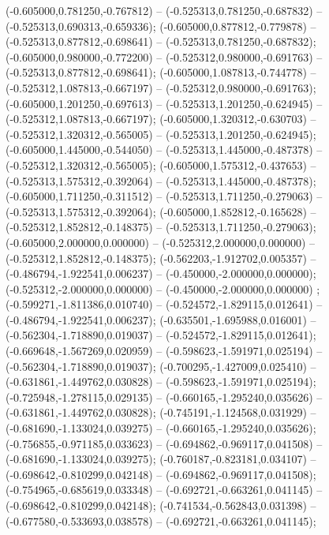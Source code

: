  (-0.605000,0.781250,-0.767812) -- (-0.525313,0.781250,-0.687832) -- (-0.525313,0.690313,-0.659336);
 (-0.605000,0.877812,-0.779878) -- (-0.525313,0.877812,-0.698641) -- (-0.525313,0.781250,-0.687832);
 (-0.605000,0.980000,-0.772200) -- (-0.525312,0.980000,-0.691763) -- (-0.525313,0.877812,-0.698641);
 (-0.605000,1.087813,-0.744778) -- (-0.525312,1.087813,-0.667197) -- (-0.525312,0.980000,-0.691763);
 (-0.605000,1.201250,-0.697613) -- (-0.525313,1.201250,-0.624945) -- (-0.525312,1.087813,-0.667197);
 (-0.605000,1.320312,-0.630703) -- (-0.525312,1.320312,-0.565005) -- (-0.525313,1.201250,-0.624945);
 (-0.605000,1.445000,-0.544050) -- (-0.525313,1.445000,-0.487378) -- (-0.525312,1.320312,-0.565005);
 (-0.605000,1.575312,-0.437653) -- (-0.525313,1.575312,-0.392064) -- (-0.525313,1.445000,-0.487378);
 (-0.605000,1.711250,-0.311512) -- (-0.525313,1.711250,-0.279063) -- (-0.525313,1.575312,-0.392064);
 (-0.605000,1.852812,-0.165628) -- (-0.525312,1.852812,-0.148375) -- (-0.525313,1.711250,-0.279063);
 (-0.605000,2.000000,0.000000) -- (-0.525312,2.000000,0.000000) -- (-0.525312,1.852812,-0.148375);
 (-0.562203,-1.912702,0.005357) -- (-0.486794,-1.922541,0.006237) -- (-0.450000,-2.000000,0.000000);
 (-0.525312,-2.000000,0.000000) -- (-0.450000,-2.000000,0.000000) ;
 (-0.599271,-1.811386,0.010740) -- (-0.524572,-1.829115,0.012641) -- (-0.486794,-1.922541,0.006237);
 (-0.635501,-1.695988,0.016001) -- (-0.562304,-1.718890,0.019037) -- (-0.524572,-1.829115,0.012641);
 (-0.669648,-1.567269,0.020959) -- (-0.598623,-1.591971,0.025194) -- (-0.562304,-1.718890,0.019037);
 (-0.700295,-1.427009,0.025410) -- (-0.631861,-1.449762,0.030828) -- (-0.598623,-1.591971,0.025194);
 (-0.725948,-1.278115,0.029135) -- (-0.660165,-1.295240,0.035626) -- (-0.631861,-1.449762,0.030828);
 (-0.745191,-1.124568,0.031929) -- (-0.681690,-1.133024,0.039275) -- (-0.660165,-1.295240,0.035626);
 (-0.756855,-0.971185,0.033623) -- (-0.694862,-0.969117,0.041508) -- (-0.681690,-1.133024,0.039275);
 (-0.760187,-0.823181,0.034107) -- (-0.698642,-0.810299,0.042148) -- (-0.694862,-0.969117,0.041508);
 (-0.754965,-0.685619,0.033348) -- (-0.692721,-0.663261,0.041145) -- (-0.698642,-0.810299,0.042148);
 (-0.741534,-0.562843,0.031398) -- (-0.677580,-0.533693,0.038578) -- (-0.692721,-0.663261,0.041145);
